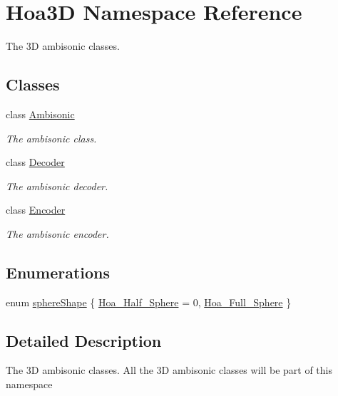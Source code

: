 \hypertarget{namespace_hoa3_d}{\section{Hoa3\-D Namespace Reference}
\label{namespace_hoa3_d}
}


The 3\-D ambisonic classes.  


\subsection*{Classes}
\begin{DoxyCompactItemize}
\item 
class \hyperlink{class_hoa3_d_1_1_ambisonic}{Ambisonic}
\begin{DoxyCompactList}\small\item\em The ambisonic class. \end{DoxyCompactList}\item 
class \hyperlink{class_hoa3_d_1_1_decoder}{Decoder}
\begin{DoxyCompactList}\small\item\em The ambisonic decoder. \end{DoxyCompactList}\item 
class \hyperlink{class_hoa3_d_1_1_encoder}{Encoder}
\begin{DoxyCompactList}\small\item\em The ambisonic encoder. \end{DoxyCompactList}\end{DoxyCompactItemize}
\subsection*{Enumerations}
\begin{DoxyCompactItemize}
\item 
enum \hyperlink{namespace_hoa3_d_a96e1558dd670aa7cddab38a58aa10c49}{sphere\-Shape} \{ \hyperlink{namespace_hoa3_d_a96e1558dd670aa7cddab38a58aa10c49a688ab39f396b4912d261dc7a89e7dba8}{Hoa\-\_\-\-Half\-\_\-\-Sphere} = 0, 
\hyperlink{namespace_hoa3_d_a96e1558dd670aa7cddab38a58aa10c49aeb2d6c7f779a838421f9999a46a2ca22}{Hoa\-\_\-\-Full\-\_\-\-Sphere}
 \}
\end{DoxyCompactItemize}


\subsection{Detailed Description}
The 3\-D ambisonic classes. All the 3\-D ambisonic classes will be part of this namespace 

